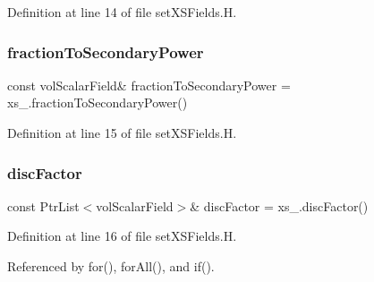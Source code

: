 Definition at line 14 of file set\+X\+S\+Fields.\+H.

\mbox{\label{setXSFields_8H_a333f327f48d6300db4dcab219afd7d02}} 
\subsubsection{\texorpdfstring{fraction\+To\+Secondary\+Power}{fractionToSecondaryPower}}
{\footnotesize\ttfamily const vol\+Scalar\+Field\& fraction\+To\+Secondary\+Power = xs\+\_\+.\+fraction\+To\+Secondary\+Power()}



Definition at line 15 of file set\+X\+S\+Fields.\+H.

\mbox{\label{setXSFields_8H_aca0aa696c44af08f57bdca6faeba4e82}} 
\subsubsection{\texorpdfstring{disc\+Factor}{discFactor}}
{\footnotesize\ttfamily const Ptr\+List$<$vol\+Scalar\+Field$>$\& disc\+Factor = xs\+\_\+.\+disc\+Factor()}



Definition at line 16 of file set\+X\+S\+Fields.\+H.



Referenced by for(), for\+All(), and if().

